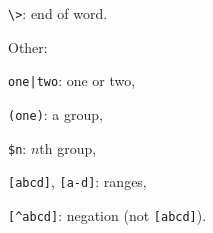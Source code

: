 \begin{itemx}
\begin{itemx}
\item \texttt{\textbackslash{}>}: end of word.
\end{itemx}
\item Other:
\begin{itemx}
\item \texttt{one|two}: one or two,
\item \texttt{(one)}: a group,
\item \texttt{\$n}: $n$th group,
\item \texttt{[abcd]}, \texttt{[a-d]}: ranges,
\item \texttt{[\textasciicircum{}abcd]}: negation (not \texttt{[abcd]}).
\end{itemx}
\end{itemx}
